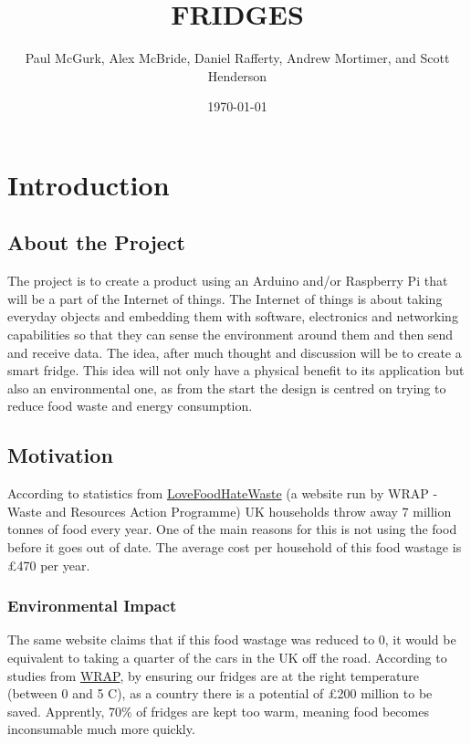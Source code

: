 \documentclass[10pt]{article}
\title{FRIDGES}
\author{Paul McGurk, Alex McBride, Daniel Rafferty, Andrew Mortimer, and Scott Henderson}
\date{\today}
\begin{document}
\begin{titlepage}
\maketitle
\end{titlepage}

\linespread{1.15} %
\renewcommand{\arraystretch}{1.2} %

\tableofcontents

\newpage
\section{Introduction}

\subsection{About the Project}
The project is to create a product using an Arduino and/or Raspberry Pi that will be a part of the Internet of things. The Internet of things is about taking everyday objects and embedding them with software, electronics and networking capabilities so that they can sense the environment around them and then send and receive data. The idea, after much thought and discussion will be to create a smart fridge. This idea will not only have a physical benefit to its application but also an environmental one, as from the start the design is centred on trying to reduce food waste and energy consumption.

\subsection{Motivation}
According to statistics from \href{http://www.lovefoodhatewaste.com/content/facts-about-food-waste-1}{LoveFoodHateWaste} (a website run by WRAP - Waste and Resources Action Programme) UK households throw away 7 million tonnes of food every year. One of the main reasons for this is not using the food before it goes out of date. The average cost per household of this food wastage is \pounds 470 per year.

\subsubsection{Environmental Impact}

The same website claims that if this food wastage was reduced to 0, it would be equivalent to taking a quarter of the cars in the UK off the road. According to studies from \href{http://www.lovefoodhatewaste.com/content/love-your-fridge-and-waste-less}{WRAP}, by ensuring our fridges are at the right temperature (between 0 and 5 \degree C), as a country there is a potential of \pounds 200 million to be saved. Apprently, 70\% of fridges are kept too warm, meaning food becomes inconsumable much more quickly.
\end{document}
